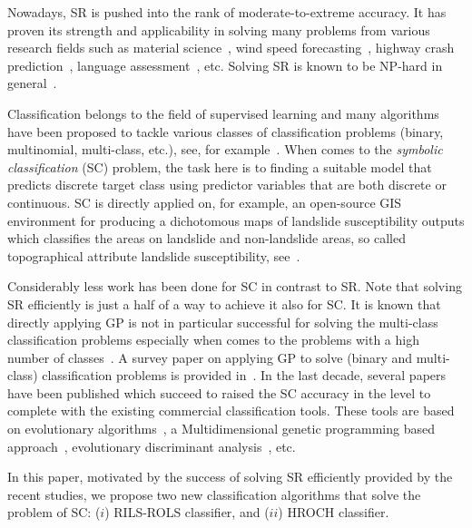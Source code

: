 \documentclass{bmcart}
\begin{document}
Nowadays, SR is pushed into the rank of moderate-to-extreme accuracy.  It has proven its strength and applicability in solving many problems from various research fields such as material science~\cite{wang2019symbolic}, wind speed forecasting~\cite{abdellaoui2021symbolic},  highway crash prediction~\cite{veran2023interpretable}, language assessment~\cite{aryadoust2015application}, etc.  Solving SR is known to be NP-hard in general~\cite{virgolin2022symbolic}. 


Classification belongs to the field of supervised learning and many algorithms have been proposed to tackle various classes of classification problems (binary, multinomial, multi-class, etc.), see, for example~\cite{cunningham2008supervised, caruana2006empirical}. When comes to the \emph{symbolic classification} (SC) problem, the task here is to finding a suitable model that predicts discrete target class using predictor variables that are both discrete or continuous.  SC is directly applied on, for example, an open-source GIS environment for producing a dichotomous maps of landslide susceptibility outputs which classifies the areas on landslide and non-landslide areas, so called topographical attribute landslide susceptibility,   see~\cite{gorsevski2021evolutionary}. 

 Considerably less work has been done for SC in contrast to SR. Note that solving SR efficiently is just a half of a way to achieve it also for SC. It is known that directly applying GP is not in particular successful for solving the multi-class classification problems especially when comes to the problems with a high number of classes~\cite{korns2018evolutionary}. A survey paper on applying GP to solve (binary and multi-class) classification problems is provided in~\cite{espejo2009survey}.  In the last decade, several papers have been published which succeed to raised the SC accuracy in the level to complete with the existing commercial classification tools. These tools are based on evolutionary algorithms~\cite{korns2018evolutionary}, a Multidimensional genetic programming based approach~\cite{munoz2015m3gp,la2019multidimensional},  evolutionary discriminant analysis~\cite{korns2017evolutionary}, etc.  

In this paper, motivated by the success of solving SR efficiently provided by the recent studies, we propose two new classification algorithms that solve the problem of SC: ($i$) RILS-ROLS classifier, and ($ii$) HROCH classifier. 


\end{document}
